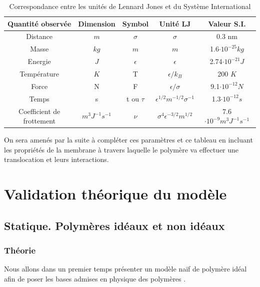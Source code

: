 \begin{table}
\begin{center}
\begin{tabular}{|c|c|c|c|c|}
  \hline
  Quantité observée & Dimension & Symbol & Unité LJ & Valeur S.I. \\
  \hline
  Distance & $m$ & $\sigma$ & $\sigma$ & 0.3 nm\\
  Masse & $kg$ & $m$ & $m$ & 1.6$\cdot 10^{-25} kg$ \\
  Energie & $J$ & $\epsilon$ & $\epsilon$ & 2.74$\cdot 10^{-21} J$\\
  Température & $K$ & T & $\epsilon/k_B$ & 200 $K$\\
  Force & N  & F & $\epsilon/\sigma$ & 9.1$\cdot 10^{-12} N$ \\
  Temps & s & t ou $\tau$ & $\epsilon^{1/2} m^{-1/2} \sigma^{-1} $& 1.3$\cdot 10^{-12} s$\\
  Coefficient de frottement & $ m^3 J^{-1} s^{-1}$ & $ \nu$ & $ \sigma^4 \epsilon^{-3/2} m^{1/2}$ & 7.6$\cdot 10^{-9} m^3J^{-1}s^{-1}$\\
  
  \hline
\end{tabular}
\caption[Correspondance unités de Lennard Jones / S.I. ]{Correspondance entre les unités de Lennard Jones et du Système International}

\end{center}
\end{table}



On sera amenés par la suite à compléter ces paramètres et ce tableau en incluant les propriétés de la membrane à travers laquelle le polymère va effectuer une translocation et leurs interactions.

\section{Validation théorique du modèle}

\subsection{Statique. Polymères idéaux et non idéaux}

\subsubsection{Théorie}
Nous allons dans un premier temps présenter un modèle naïf de polymère idéal afin de poser les bases admises en physique des polymères \cite{Gennes197911,Flory195312,Doi199507,these}.\\

